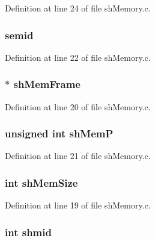 Definition at line 24 of file shMemory.c.

\hypertarget{structsh_mem_a9222a19bf63a4f9775ec6307f10955ac}{
\subsubsection[{semid}]{ {\bf semid}}}
\label{structsh_mem_a9222a19bf63a4f9775ec6307f10955ac}


Definition at line 22 of file shMemory.c.

\hypertarget{structsh_mem_a21b32e7678691034a296926c350c2d62}{
\subsubsection[{shMemFrame}]{$\ast$ {\bf shMemFrame}}}
\label{structsh_mem_a21b32e7678691034a296926c350c2d62}


Definition at line 20 of file shMemory.c.

\hypertarget{structsh_mem_af69f25548b68c95b9142a8cea59796bb}{
\subsubsection[{shMemP}]{\setlength{\rightskip}{0pt plus 5cm}unsigned int {\bf shMemP}}}
\label{structsh_mem_af69f25548b68c95b9142a8cea59796bb}


Definition at line 21 of file shMemory.c.

\hypertarget{structsh_mem_a43617d0cfffcc8578872707c8804b381}{
\subsubsection[{shMemSize}]{\setlength{\rightskip}{0pt plus 5cm}int {\bf shMemSize}}}
\label{structsh_mem_a43617d0cfffcc8578872707c8804b381}


Definition at line 19 of file shMemory.c.

\hypertarget{structsh_mem_ac8807d215d2ee6d9779d76aeb1147430}{
\subsubsection[{shmid}]{\setlength{\rightskip}{0pt plus 5cm}int {\bf shmid}}}
\label{structsh_mem_ac8807d215d2ee6d9779d76aeb1147430}


